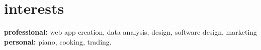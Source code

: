 \documentclass[]{friggeri-cv} %
\begin{document}
\section{interests}
\textbf{professional:} web app creation, data analysis, design, software design, marketing
\textbf{personal:} piano, cooking, trading.
\end{document}
